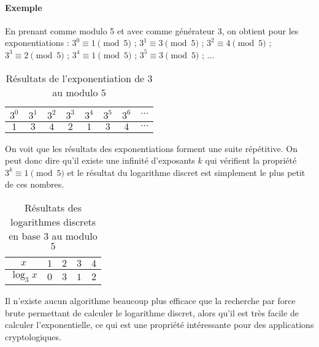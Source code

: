 \documentclass[10pt,a4paper,twoside]{article}
\numberwithin{equation}{section}
\begin{document}
			\paragraph{Exemple}
				En prenant comme modulo 5 et avec comme générateur 3, on obtient pour les exponentiations : $3^0 \equiv 1 \pmod 5$ ; $3^1 \equiv 3 \pmod 5$ ; $3^2 \equiv 4 \pmod 5$ ; $3^3 \equiv 2 \pmod 5$ ; $3^4 \equiv 1 \pmod 5$ ; $3^5 \equiv 3 \pmod 5$ ; ...
				\begin{table}[H]
					\centering			
					\begin{tabular}{|c|c|c|c|c|c|c|c|}
						\hline
						\rowcolor{gray!40} $3^0$ & $3^1$ & $3^2$ & $3^3$ & $3^4$ & $3^5$ & $3^6$ & $\cdots$ \\
						\hline
						$1$ & $3$ & $4$ & $2$ & $1$ & $3$ & $4$ & $\cdots$ \\
						\hline
						
					\end{tabular}
					\caption{Résultats de l'exponentiation de $3$ au modulo $5$}
				\end{table}
				On voit que les résultats des exponentiations forment une suite répétitive. On peut donc dire qu'il existe une infinité d'exposants $k$ qui vérifient la propriété $3^k \equiv 1 \pmod 5$ et le résultat du logarithme discret est simplement le plus petit de ces nombres.
				\begin{table}[H]
					\centering
					\begin{tabular}{|c|c|c|c|c|}
						\hline
						\rowcolor{gray!40} $x$ & $1$ & $2$ & $3$ & $4$ \\
						\hline
						$ \log_3 x$ & $0$ & $3$ & $1$ & $2$\\
						\hline
					\end{tabular}
					\caption{Résultats des logarithmes discrets en base $3$ au modulo $5$}
				\end{table}
				
			Il n'existe aucun algorithme beaucoup plus efficace que la recherche par force brute permettant de calculer le logarithme discret, alors qu'il est très facile de calculer l'exponentielle, ce qui est une propriété intéressante pour des applications cryptologiques.
				
\end{document}
